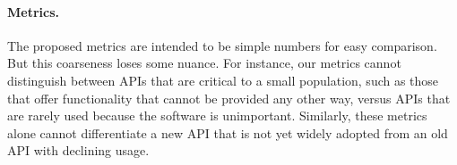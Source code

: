 \paragraph{Metrics.}
The proposed metrics are intended to be simple numbers for easy comparison.
But this coarseness loses some nuance. 
For instance, our metrics cannot distinguish between
APIs that are critical to a small population, such as those that offer 
functionality that cannot be provided any other way, 
versus APIs that are rarely used because the software is unimportant.
Similarly, these metrics alone cannot differentiate a new API 
that is not yet widely adopted from an old API with declining usage.


